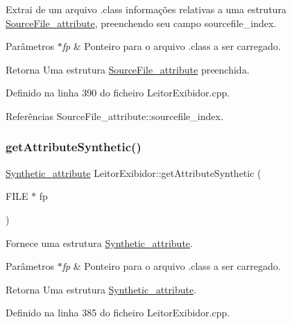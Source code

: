 Extrai de um arquivo .class informações relativas a uma estrutura \hyperlink{structSourceFile__attribute}{Source\+File\+\_\+attribute}, preenchendo seu campo sourcefile\+\_\+index. 
\begin{DoxyParams}{Parâmetros}
{\em $\ast$fp} & Ponteiro para o arquivo .class a ser carregado. \\
\hline
\end{DoxyParams}
\begin{DoxyReturn}{Retorna}
Uma estrutura \hyperlink{structSourceFile__attribute}{Source\+File\+\_\+attribute} preenchida. 
\end{DoxyReturn}


Definido na linha 390 do ficheiro Leitor\+Exibidor.\+cpp.



Referências Source\+File\+\_\+attribute\+::sourcefile\+\_\+index.

\mbox{\label{classLeitorExibidor_a96f65a9e09e511128366ec9a1407ecb1}} 
\subsubsection{\texorpdfstring{get\+Attribute\+Synthetic()}{getAttributeSynthetic()}}
{\footnotesize\ttfamily \hyperlink{structSynthetic__attribute}{Synthetic\+\_\+attribute} Leitor\+Exibidor\+::get\+Attribute\+Synthetic (\begin{DoxyParamCaption}\item[{F\+I\+LE $\ast$}]{fp }\end{DoxyParamCaption})\hspace{0.3cm}{\ttfamily [private]}}

Fornece uma estrutura \hyperlink{structSynthetic__attribute}{Synthetic\+\_\+attribute}. 
\begin{DoxyParams}{Parâmetros}
{\em $\ast$fp} & Ponteiro para o arquivo .class a ser carregado. \\
\hline
\end{DoxyParams}
\begin{DoxyReturn}{Retorna}
Uma estrutura \hyperlink{structSynthetic__attribute}{Synthetic\+\_\+attribute}. 
\end{DoxyReturn}


Definido na linha 385 do ficheiro Leitor\+Exibidor.\+cpp.

